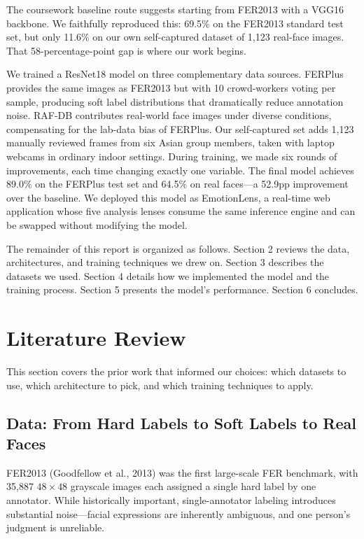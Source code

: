 \documentclass[12pt,a4paper]{article}
\begin{document}
The coursework baseline route suggests starting from FER2013 with a VGG16 backbone. We faithfully reproduced this: 69.5\% on the FER2013 standard test set, but only 11.6\% on our own self-captured dataset of 1,123 real-face images. That 58-percentage-point gap is where our work begins.

We trained a ResNet18 model on three complementary data sources. FERPlus provides the same images as FER2013 but with 10 crowd-workers voting per sample, producing soft label distributions that dramatically reduce annotation noise. RAF-DB contributes real-world face images under diverse conditions, compensating for the lab-data bias of FERPlus. Our self-captured set adds 1,123 manually reviewed frames from six Asian group members, taken with laptop webcams in ordinary indoor settings. During training, we made six rounds of improvements, each time changing exactly one variable. The final model achieves 89.0\% on the FERPlus test set and 64.5\% on real faces---a 52.9pp improvement over the baseline. We deployed this model as EmotionLens, a real-time web application whose five analysis lenses consume the same inference engine and can be swapped without modifying the model.

The remainder of this report is organized as follows. Section 2 reviews the data, architectures, and training techniques we drew on. Section 3 describes the datasets we used. Section 4 details how we implemented the model and the training process. Section 5 presents the model's performance. Section 6 concludes.

\section{Literature Review}

This section covers the prior work that informed our choices: which datasets to use, which architecture to pick, and which training techniques to apply.

\subsection{Data: From Hard Labels to Soft Labels to Real Faces}

FER2013 (Goodfellow et al., 2013) was the first large-scale FER benchmark, with 35,887 $48\times48$ grayscale images each assigned a single hard label by one annotator. While historically important, single-annotator labeling introduces substantial noise---facial expressions are inherently ambiguous, and one person's judgment is unreliable.
\end{document}
